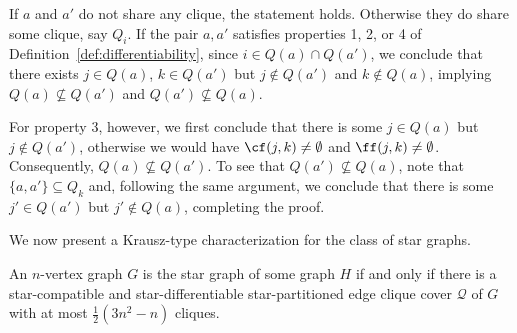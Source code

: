 \begin{tproof}
    If $a$ and $a'$ do not share any clique, the statement holds.
    Otherwise they do share some clique, say $Q_i$.
    If the pair $a,a'$ satisfies properties 1, 2, or 4 of Definition~\ref{def:differentiability}, since $i \in Q(a) \cap Q(a')$, we conclude that there exists $j \in Q(a)$, $k \in Q(a')$ but $j \notin Q(a')$ and $k \notin Q(a)$, implying $Q(a) \nsubseteq Q(a')$ and $Q(a') \nsubseteq Q(a)$.
    
    For property 3, however, we first conclude that there is some $j \in Q(a)$ but $j \notin Q(a')$, otherwise we would have $\cf(j,k) \neq \emptyset$ and $\ff(j,k) \neq \emptyset$.
    Consequently, $Q(a) \nsubseteq Q(a')$.
    To see that $Q(a') \nsubseteq Q(a)$, note that $\{a, a'\} \subseteq Q_k$ and, following the same argument, we conclude that there is some $j' \in Q(a')$ but $j' \notin Q(a)$, completing the proof.
\end{tproof}

We now present a Krausz-type characterization for the class of star graphs.

\begin{theorem}
    \label{thm:star_characterization}
    An $n$-vertex graph $G$ is the star graph of some graph $H$ if and only if there is a star-compatible and star-differentiable star-partitioned edge clique cover $\mathcal{Q}$ of $G$ with at most $\frac{1}{2}(3n^2 - n)$ cliques.
\end{theorem}

